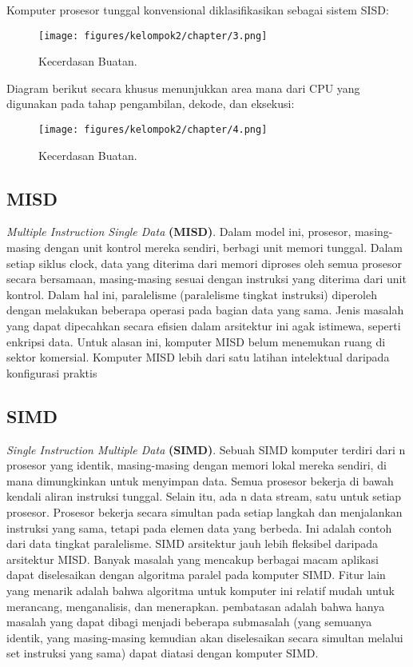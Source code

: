 \noindent
Komputer prosesor tunggal konvensional diklasifikasikan sebagai sistem SISD:

\begin{figure}[H]
	\texttt{[image: figures/kelompok2/chapter/3.png]}
	\centering
	\caption{Kecerdasan Buatan.}
\end{figure}

\noindent
Diagram berikut secara khusus menunjukkan area mana dari CPU yang digunakan pada tahap pengambilan, dekode, dan eksekusi:

\begin{figure}[H]
	\texttt{[image: figures/kelompok2/chapter/4.png]}
	\centering
	\caption{Kecerdasan Buatan.}
\end{figure}

\subsection{MISD}
\textit{Multiple Instruction Single Data} \textbf{(MISD)}. Dalam model ini, prosesor, masing-masing dengan unit kontrol mereka sendiri, berbagi unit memori tunggal. Dalam setiap siklus clock, data yang diterima dari memori diproses oleh semua prosesor secara bersamaan, masing-masing sesuai dengan instruksi yang diterima dari unit kontrol. Dalam hal ini, paralelisme (paralelisme tingkat instruksi) diperoleh dengan melakukan beberapa operasi pada bagian data yang sama. Jenis masalah yang dapat dipecahkan secara efisien dalam arsitektur ini agak istimewa, seperti enkripsi data. Untuk alasan ini, komputer MISD belum menemukan ruang di sektor komersial. Komputer MISD lebih dari satu latihan intelektual daripada konfigurasi praktis

\subsection{SIMD}
\textit{Single Instruction Multiple Data} \textbf{(SIMD)}. Sebuah SIMD komputer terdiri dari n prosesor yang identik, masing-masing dengan memori lokal mereka sendiri, di mana dimungkinkan untuk menyimpan data. Semua prosesor bekerja di bawah kendali aliran instruksi tunggal. Selain itu, ada n data stream, satu untuk setiap prosesor. Prosesor bekerja secara simultan pada setiap langkah dan menjalankan instruksi yang sama, tetapi pada elemen data yang berbeda. Ini adalah contoh dari data tingkat paralelisme.
SIMD arsitektur jauh lebih fleksibel daripada arsitektur MISD. Banyak masalah yang mencakup berbagai macam aplikasi dapat diselesaikan dengan algoritma paralel pada komputer SIMD. Fitur lain yang menarik adalah bahwa algoritma untuk komputer ini relatif mudah untuk merancang, menganalisis, dan menerapkan. pembatasan adalah bahwa hanya masalah yang dapat dibagi menjadi beberapa submasalah (yang semuanya identik, yang masing-masing kemudian akan diselesaikan secara simultan melalui set instruksi yang sama) dapat diatasi dengan komputer SIMD.
